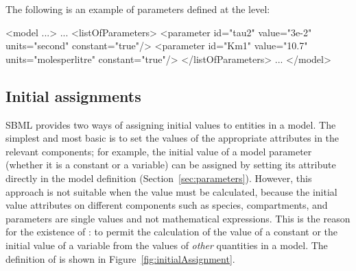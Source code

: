 The following is an example of parameters defined at the \Model level:

\begin{example}
<model ...>
    ...
    <listOfParameters>
        <parameter id="tau2" value="3e-2" units="second"        constant="true"/>
        <parameter id="Km1"  value="10.7" units="molesperlitre" constant="true"/>
    </listOfParameters>
    ...
</model>
\end{example}


\subsection{Initial assignments}
\label{sec:initialAssignment}

SBML \thisLV provides two ways of assigning initial values to
entities in a model.  The simplest and most basic is to set the
values of the appropriate attributes in the relevant
components; for example, the initial value of a model parameter
(whether it is a constant or a variable) can be assigned by
setting its  attribute directly in the model definition
(Section~\ref{sec:parameters}).  However, this approach is not
suitable when the value must be calculated, because the initial
value attributes on different components such as species,
compartments, and parameters are single values and not
mathematical expressions.  This is the reason for the existence
of \InitialAssignment: to permit the calculation of the value of a
constant or the initial value of a variable from the values of
\emph{other} quantities in a model.  The definition of
\InitialAssignment is shown in Figure~\vref{fig:initialAssignment}.

